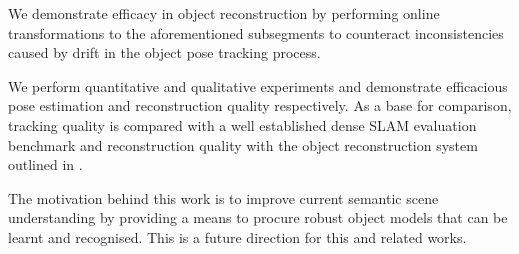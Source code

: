 We demonstrate efficacy in object reconstruction by performing online transformations to the aforementioned subsegments to counteract inconsistencies caused by drift in the object pose tracking process.

We perform quantitative and qualitative experiments and demonstrate efficacious pose estimation and reconstruction quality respectively. As a base 
for comparison, tracking quality is compared with a well established dense SLAM evaluation benchmark \cite{sturm12iros} and reconstruction quality 
with the object reconstruction system outlined in \cite{Ren2013}.

The motivation behind this work is to improve current semantic scene understanding\cite{Valentin2015, Golodetz2015} by providing a means to procure 
robust object models that can be learnt and recognised. This is a future direction for this and related works.
